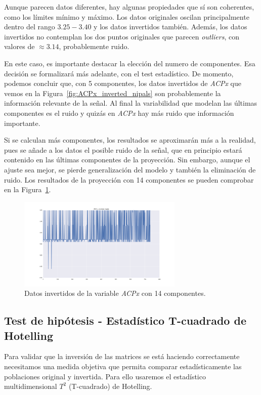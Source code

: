\documentclass[11pt,spanish,listoffigures,listoftables]{tfgetsinf}
\begin{document}
    Aunque parecen datos diferentes, hay algunas propiedades que sí son coherentes, como los límites mínimo y máximo. Los datos originales oscilan principalmente dentro del rango \(3.25-3.40\) y los datos invertidos también. Además, los datos invertidos no contemplan los dos puntos originales que parecen {\em outliers}, con valores de \(\approx 3.14\), probablemente ruido.
    
    En este caso, es importante destacar la elección del numero de componentes. Esa decisión se formalizará más adelante, con el test estadístico. De momento, podemos concluir que, con 5 componentes, los datos invertidos de {\em ACPx} que vemos en la Figura~\ref{fig:ACPx_inverted_nipals} son probablemente la información relevante de la señal. Al final la variabilidad que modelan las últimas componentes es el ruido y quizás en {\em ACPx} hay más ruido que información importante.
    
    Si se calculan más componentes, los resultados se aproximarán más a la realidad, pues se añade a los datos el posible ruido de la señal, que en principio estará contenido en las últimas componentes de la proyección. Sin embargo, aunque el ajuste sea mejor, se pierde generalización del modelo y también la eliminación de ruido. Los resultados de la proyección con 14 componentes se pueden comprobar en la Figura~\ref{fig:ACPx_inverted_nipals_pca14}.
    
    \begin{figure}[H]
        \centering
        \includegraphics[width=0.7\textwidth]{ACPx_inverted_nipals_pca14.png}
        \caption{Datos invertidos de la variable {\em ACPx} con 14 componentes.}
        \label{fig:ACPx_inverted_nipals_pca14}
    \end{figure}


    \subsection{Test de hipótesis - Estadístico T-cuadrado de Hotelling}
    Para validar que la inversión de las matrices se está haciendo correctamente necesitamos una medida objetiva que permita comparar estadísticamente las poblaciones original y invertida. Para ello usaremos el estadístico multidimensional \(T^2\) (T-cuadrado) de Hotelling. 
    
\end{document}
